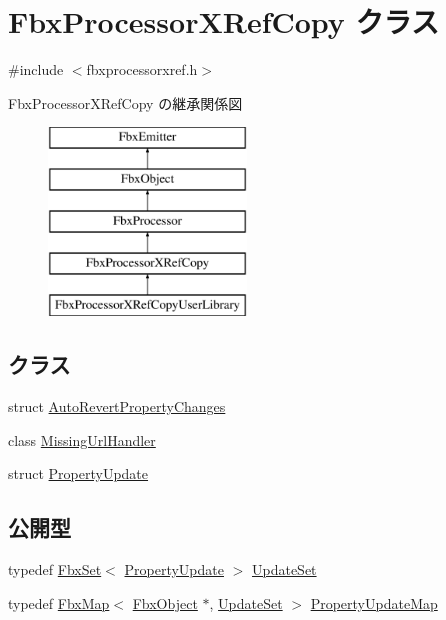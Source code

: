 \hypertarget{class_fbx_processor_x_ref_copy}{}\section{Fbx\+Processor\+X\+Ref\+Copy クラス}
\label{class_fbx_processor_x_ref_copy}


{\ttfamily \#include $<$fbxprocessorxref.\+h$>$}

Fbx\+Processor\+X\+Ref\+Copy の継承関係図\begin{figure}[H]
\begin{center}
\leavevmode
\includegraphics[height=5.000000cm]{class_fbx_processor_x_ref_copy}
\end{center}
\end{figure}
\subsection*{クラス}
\begin{DoxyCompactItemize}
\item 
struct \hyperlink{struct_fbx_processor_x_ref_copy_1_1_auto_revert_property_changes}{Auto\+Revert\+Property\+Changes}
\item 
class \hyperlink{class_fbx_processor_x_ref_copy_1_1_missing_url_handler}{Missing\+Url\+Handler}
\item 
struct \hyperlink{struct_fbx_processor_x_ref_copy_1_1_property_update}{Property\+Update}
\end{DoxyCompactItemize}
\subsection*{公開型}
\begin{DoxyCompactItemize}
\item 
typedef \hyperlink{class_fbx_set}{Fbx\+Set}$<$ \hyperlink{struct_fbx_processor_x_ref_copy_1_1_property_update}{Property\+Update} $>$ \hyperlink{class_fbx_processor_x_ref_copy_aa745209208dc5e21926fa7d4dde84afb}{Update\+Set}
\item 
typedef \hyperlink{class_fbx_map}{Fbx\+Map}$<$ \hyperlink{class_fbx_object}{Fbx\+Object} $\ast$, \hyperlink{class_fbx_processor_x_ref_copy_aa745209208dc5e21926fa7d4dde84afb}{Update\+Set} $>$ \hyperlink{class_fbx_processor_x_ref_copy_af0408f51b60aa6c9fb8aab6e73f57eb7}{Property\+Update\+Map}
\end{DoxyCompactItemize}

